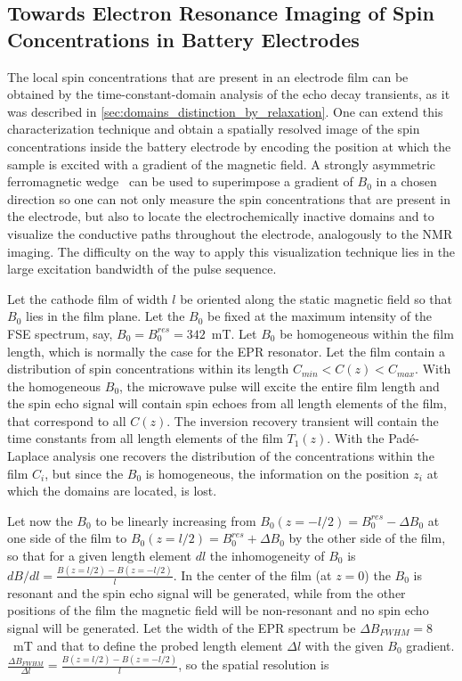 \subsection{Towards Electron Resonance Imaging of Spin Concentrations in Battery Electrodes}
The local spin concentrations that are present in an electrode film can be obtained by the time-constant-domain analysis of the echo decay transients, as it was described in \ref{sec:domains_distinction_by_relaxation}. One can extend this characterization technique and obtain a spatially resolved image of the spin concentrations inside the battery electrode by encoding the position at which the sample is excited with a gradient of the magnetic field. A strongly asymmetric ferromagnetic wedge~\cite{SternGerlach1922} can be used to superimpose a gradient of $B_0$ in a chosen direction so one can not only measure the spin concentrations that are present in the electrode, but also to locate the electrochemically inactive domains and to visualize the conductive paths throughout the electrode, analogously to the NMR imaging. The difficulty on the way to apply this visualization technique lies in the large excitation bandwidth of the pulse sequence.
\par
Let the cathode film of width $l$ be oriented along the static magnetic field so that $B_0$ lies in the film plane. Let the $B_0$ be fixed at the maximum intensity of the FSE spectrum, say, $B_0 = B_0^{res}=342$~mT. Let $B_0$ be homogeneous within the film length, which is normally the case for the EPR resonator. Let the film contain a distribution of spin concentrations within its length $C_{min}<C(z)<C_{max}$. With the homogeneous $B_0$, the microwave pulse will excite the entire film length and the spin echo signal will contain spin echoes from all length elements of the film, that correspond to all $C(z)$. The inversion recovery transient will contain the time constants from all length elements of the film $T_1(z)$. With the Pad{\'e}-Laplace analysis one recovers the distribution of the concentrations within the film $C_i$, but since the $B_0$ is homogeneous, the information on the position $z_i$ at which the domains are located, is lost. 
\par
Let now the $B_0$ to be linearly increasing from $B_0(z=-l/2) = B_0^{res}-\Delta B_0$ at one side of the film to $B_0(z=l/2)=B_0^{res}+ \Delta B_0$ by the other side of the film, so that for a given length element $dl$ the inhomogeneity of $B_0$ is $dB/dl = \frac{B(z=l/2)-B(z=-l/2)}{l}$. In the center of the film (at $z=0$) the $B_0$ is resonant and the spin echo signal will be generated, while from the other positions of the film the magnetic field will be non-resonant and no spin echo signal will be generated. Let the width of the EPR spectrum be $\Delta B_{FWHM}=8$~mT and that to define the probed length element $\Delta l$ with the given $B_0$ gradient. $\frac{\Delta B_{FWHM}}{\Delta l} = \frac{B(z=l/2)-B(z=-l/2)}{l}$, so the spatial resolution is 

